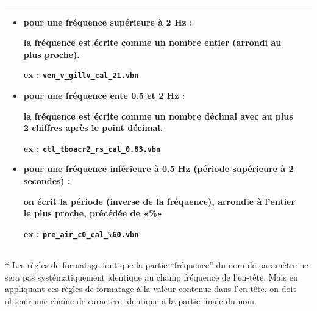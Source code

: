 \begin{center}
\begin{tabular}{|p{3cm}|p{11cm}|}
\begin{itemize}
           ex : \texttt{OMEGA\_\textbf{0}.vbn}

  \item[•] pour une fréquence supérieure à 2 Hz :

           la fréquence est écrite comme un nombre entier (arrondi au plus
           proche).

           ex : \texttt{ven\_v\_gillv\_cal\_\textbf{21}.vbn}

  \item[•] pour une fréquence ente 0.5 et 2 Hz :

           la fréquence est écrite comme un nombre décimal avec au plus
           2 chiffres après le point décimal.

           ex : \texttt{ctl\_tboacr2\_rs\_cal\_\textbf{0.83}.vbn}

  \item[•] pour une fréquence inférieure à 0.5 Hz (période supérieure à
           2 secondes) :

           on écrit la période (inverse de la fréquence), arrondie à l’entier
           le plus proche, précédée de «\%»

           ex : \texttt{pre\_air\_c0\_cal\_\textbf{\%60}.vbn}
\end{itemize}
\\ \hline

\end{tabular}
\end{center}

* Les règles de formatage font que la partie “fréquence” du nom de paramètre ne
sera pas systématiquement identique au champ fréquence de l’en-tête. Mais en
appliquant ces règles de formatage à la valeur contenue dans l’en-tête, on doit
obtenir une chaîne de caractère identique à la partie finale du nom.

